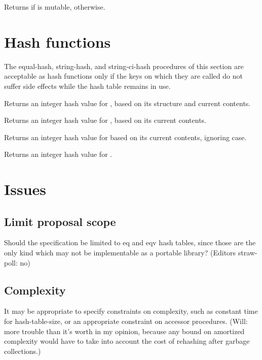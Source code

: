 \documentclass[twoside]{algol60}
\begin{document}
\begin{entry}{}
Returns \schtrue{} if  is mutable, \schfalse{} otherwise.
\end{entry}

\section{Hash functions}

The {\cf equal-hash}, {\cf string-hash}, and {\cf string-ci-hash}
procedures of this section are acceptable as hash functions only
if the keys on which they are called do not suffer side effects
while the hash table remains in use.

\begin{entry}{}
Returns an integer hash value for , based on its structure and current contents.
\end{entry}

\begin{entry}{}
Returns an integer hash value for , based on its current contents.
\end{entry}

\begin{entry}{}
Returns an integer hash value for  based on its current contents, ignoring case.
\end{entry}

\begin{entry}{}
Returns an integer hash value for .
\end{entry}

\section{Issues}

\subsection{Limit proposal scope}
Should the specification be limited to eq and eqv hash tables, since those are the only kind which may not be implementable as a portable library? (Editors straw-poll: no)

\subsection{Complexity}
It may be appropriate to specify constraints on complexity,
such as constant time for hash-table-size, or an appropriate
constraint on accessor procedures.  (Will: more trouble than
it's worth in my opinion, because any bound on amortized
complexity would have to take into account the cost of
rehashing after garbage collections.)
\end{document}
